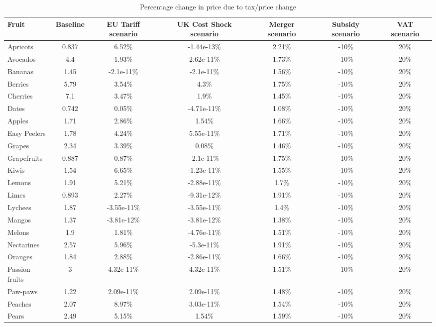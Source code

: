 \documentclass[11pt]{article}
\begin{document}
\begin{table}[h]
\caption{Percentage change in price due to tax/price change}
\label{table:tax impact 2}
\begin{center}
\begin{tabular}{lcccccc} \hline \hline
Fruit & Baseline &EU Tariff scenario &UK Cost Shock scenario &Merger scenario &Subsidy scenario &VAT scenario \\ \hline
Apricots &0.837 &6.52\% &-1.44e-13\% &2.21\% &-10\% &20\% \\
Avocados &4.4 &1.93\% &2.62e-11\% &1.73\% &-10\% &20\% \\
Bananas &1.45 &-2.1e-11\% &-2.1e-11\% &1.56\% &-10\% &20\% \\
Berries &5.79 &3.54\% &4.3\% &1.75\% &-10\% &20\% \\
Cherries &7.1 &3.47\% &1.9\% &1.45\% &-10\% &20\% \\
\hline
Dates &0.742 &0.05\% &-4.71e-11\% &1.08\% &-10\% &20\% \\
Apples &1.71 &2.86\% &1.54\% &1.66\% &-10\% &20\% \\
Easy Peelers &1.78 &4.24\% &5.55e-11\% &1.71\% &-10\% &20\% \\
Grapes &2.34 &3.39\% &0.08\% &1.46\% &-10\% &20\% \\
Grapefruits &0.887 &0.87\% &-2.1e-11\% &1.75\% &-10\% &20\% \\
\hline
Kiwis &1.54 &6.65\% &-1.23e-11\% &1.55\% &-10\% &20\% \\
Lemons &1.91 &5.21\% &-2.88e-11\% &1.7\% &-10\% &20\% \\
Limes &0.893 &2.27\% &-9.31e-12\% &1.91\% &-10\% &20\% \\
Lychees &1.87 &-3.55e-11\% &-3.55e-11\% &1.4\% &-10\% &20\% \\
Mangos &1.37 &-3.81e-12\% &-3.81e-12\% &1.38\% &-10\% &20\% \\
\hline
Melons &1.9 &1.81\% &-4.76e-11\% &1.51\% &-10\% &20\% \\
Nectarines &2.57 &5.96\% &-5.3e-11\% &1.91\% &-10\% &20\% \\
Oranges &1.84 &2.88\% &-2.86e-11\% &1.66\% &-10\% &20\% \\
Passion fruits &3 &4.32e-11\% &4.32e-11\% &1.51\% &-10\% &20\% \\
Paw-paws &1.22 &2.09e-11\% &2.09e-11\% &1.48\% &-10\% &20\% \\
\hline
Peaches &2.07 &8.97\% &3.03e-11\% &1.54\% &-10\% &20\% \\
Pears &2.49 &5.15\% &1.54\% &1.59\% &-10\% &20\% \\

\end{tabular}
\end{center}
\end{table}
\end{document}
